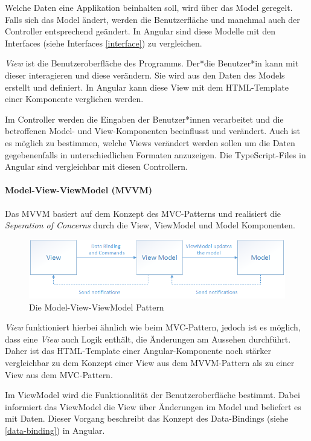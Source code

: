 Welche Daten eine Applikation beinhalten soll, wird über das Model geregelt. Falls sich das Model ändert, werden die Benutzerfläche und manchmal auch der Controller entsprechend geändert. In Angular sind diese Modelle mit den Interfaces (siehe Interfaces \ref{interface})  zu vergleichen.

\emph{View} ist die Benutzeroberfläche des Programms. Der*die Benutzer*in kann mit dieser interagieren und diese verändern. Sie wird aus den Daten des Models erstellt und definiert. In Angular kann diese View mit dem HTML-Template einer Komponente verglichen werden.

Im Controller werden die Eingaben der Benutzer*innen verarbeitet und die betroffenen Model- und View-Komponenten beeinflusst und verändert. Auch ist es möglich zu bestimmen, welche Views verändert werden sollen um die Daten gegebenenfalls in unterschiedlichen Formaten anzuzeigen. Die TypeScript-Files in Angular sind vergleichbar mit diesen Controllern.
\cite{MVC}

\paragraph{Model-View-ViewModel (MVVM)}
Das MVVM basiert auf dem Konzept des MVC-Patterns und realisiert die \emph{Seperation of Concerns} durch die View, ViewModel und Model Komponenten.

\begin{figure} [h t]
  \centering
  \includegraphics[scale=0.5]{pics/mvvm-pattern.png}
  \caption{Die Model-View-ViewModel Pattern \cite{MVVM}}
  \label{fig:tech:front:mvvm-architecture}
\end{figure}

\emph{View} funktioniert hierbei ähnlich wie beim MVC-Pattern, jedoch ist es möglich, dass eine \emph{View} auch Logik enthält, die Änderungen am Aussehen durchführt. Daher ist das HTML-Template einer Angular-Komponente noch stärker vergleichbar zu dem Konzept einer View aus dem MVVM-Pattern als zu einer View aus dem MVC-Pattern. 

Im ViewModel wird die Funktionalität der Benutzeroberfläche bestimmt. Dabei informiert das ViewModel die View über Änderungen im Model und beliefert es mit Daten. Dieser Vorgang beschreibt das Konzept des Data-Bindings (siehe \ref{data-binding}) in Angular.  

